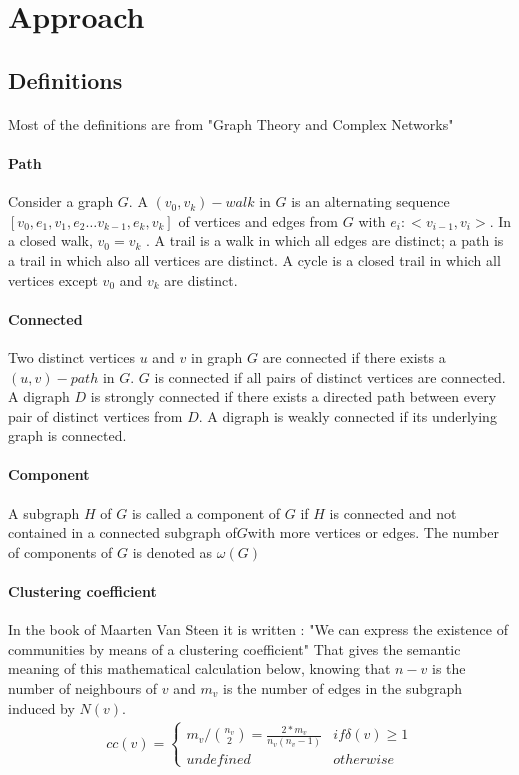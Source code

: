 \documentclass{article}
\begin{document}
\newpage
\section{Approach}
	\subsection{Definitions}
		\paragraph{}
			Most of the definitions are from "Graph Theory and Complex Networks"\cite{Steen10}
		\paragraph{Path}
			Consider a graph $G$.
			A $(v_0 , v_k)-walk$ in $G$ is an alternating sequence $[ v_0 , e_1 , v_1 , e_2 \dots v_{k-1} , e_k , v_k ]$ of vertices
			and edges from $G$ with $e_i : <v_{i-1},v_i>$.
			In a closed walk, $v_0 = v_k$ .
			A trail is a walk in which all edges are distinct; a path is a trail in which also all vertices are distinct.
			A cycle is a closed trail in which all vertices except $v_0$ and $v_k$ are distinct.
		\paragraph{Connected}
			Two distinct vertices $u$ and $v$ in graph $G$ are connected if there exists a $(u, v) - path$ in $G$.
			$G$ is connected if all pairs of distinct vertices are connected.
			A digraph $D$ is strongly connected if there exists a directed path between every pair of distinct vertices from $D$.
			A digraph is weakly connected if its underlying graph is connected.
		\paragraph{Component}
			A subgraph $H$ of $G$ is called a component of $G$ if $H$ is connected
			and not contained in a connected subgraph of$G$with more vertices or edges.
			The number of components of $G$ is denoted as $\omega(G)$
		\paragraph{Clustering coefficient}
			In the book of Maarten Van Steen it is written :
			"We can express the existence of communities by means of a clustering coefficient"\cite{Steen10}
			That gives the semantic meaning of this mathematical calculation below,
			knowing that $n-v$ is the number of neighbours of $v$
			and $m_v$ is the number of edges in the subgraph induced by $N(v)$.
		\begin{align*}
			cc(v) = \begin{cases}
				m_v/ \binom{n_v}{2} = \frac{2*m_v}{n_v(n_v-1)} & if \delta(v) \ge 1 \\
				undefined & otherwise
			\end{cases}
		\end{align*}
\end{document}
